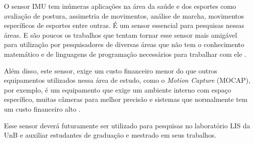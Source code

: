 O sensor IMU tem inúmeras aplicações na área da saúde e dos esportes como avaliação de postura, assimetria de movimentos, análise de marcha, movimentos específicos de esportes entre outras. É um sensor essencial para pesquisas nessas áreas. E são poucos os trabalhos que tentam tornar esse sensor mais amigável para utilização por pesquisadores de diversas áreas que não tem o conhecimento matemático e de linguagens de programação necessários para trabalhar com ele \cite{ober2015}\cite{chang2016}. 

Além disso, este sensor, exige um custo financeiro menor do que outros equipamentos utilizados nessa área de estudo, como o \textit{Motion Capture} (MOCAP), por exemplo, é um equipamento que exige um ambiente interno com espaço específico, muitas câmeras para melhor precisão e sistemas que normalmente tem um custo financeiro alto \cite{chang2016}. 

Esse sensor deverá futuramente ser utilizado para  pesquisas no laboratório LIS da UnB e auxiliar estudantes de graduação e mestrado em seus trabalhos.